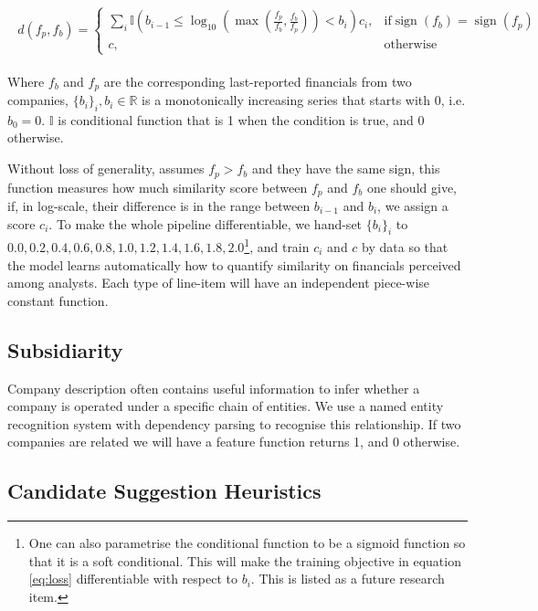 \documentclass[]{article}
\DeclareMathOperator*{\sign}{sign}
\begin{document}
\begin{align}
\begin{split}
    d(f_p, f_b) = \begin{cases}
        \sum_i \mathbb{I}(b_{i-1} \leq \log_{10}(\max(\frac{f_p}{f_b}, 
        \frac{f_b}{f_p})) < b_i)c_i, & 
        \text{if} 
        \sign{(f_b)} = \sign{(f_p)} \\
        c, &\text{otherwise} 
    \end{cases}
\end{split}
\end{align}

Where $f_b$ and $f_p$ are the corresponding last-reported financials from two 
companies, 
$\{b_i\}_i, b_i\in\mathbb{R}$ is a monotonically increasing series that 
starts with 0, i.e. $b_0=0$. 
$\mathbb{I}$ is conditional function that is 1 when the condition is true, and 
0 
otherwise.

Without loss of generality, assumes $f_p > f_b$ and they have the same sign, 
this function measures how much similarity score between 
$f_p$ and $f_b$ one should give, if, in log-scale, their difference is in the 
range between $b_{i-1}$ and $b_i$, we assign a score $c_i$. To make the whole 
pipeline differentiable, we hand-set $\{b_i\}_i$ to $0.0, 0.2, 0.4, 0.6, 0.8, 
1.0, 
1.2, 
1.4, 1.6, 1.8, 2.0$\footnote{One can also parametrise the conditional function 
to be a sigmoid function so that it is a soft conditional. This will make the 
training objective in equation \ref{eq:loss} differentiable with respect to 
$b_i$. This is listed as a future research item.}, and train $c_i$ and $c$ by 
data 
so that the 
model learns automatically how to quantify similarity on financials perceived 
among analysts. Each type of line-item will have an independent piece-wise 
constant function. 

\subsection{Subsidiarity}

Company description often contains useful information to infer whether a 
company is operated under a specific chain of entities. We use a named entity 
recognition system  with dependency parsing \cite{spacy2} to recognise this 
relationship. If two companies are related we will have a feature function 
returns 1, and 0 otherwise.

\subsection{Candidate Suggestion Heuristics}
\end{document}
